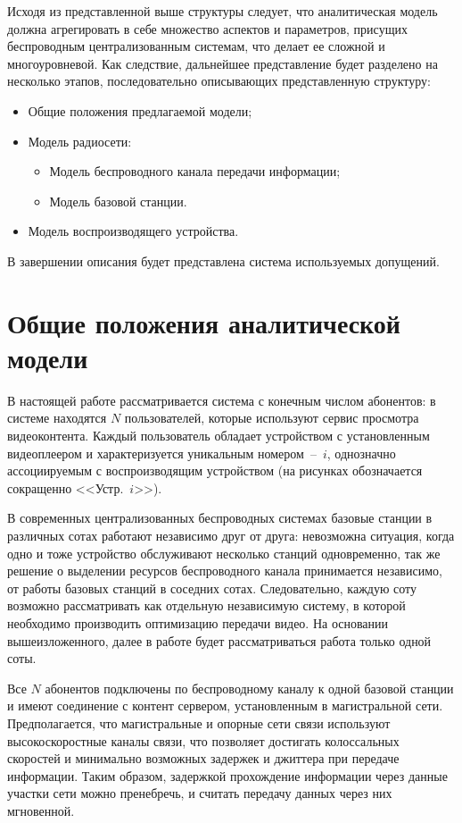Исходя из представленной выше структуры следует, что аналитическая модель должна агрегировать в себе множество аспектов и параметров, присущих беспроводным централизованным системам, что делает ее сложной и многоуровневой. Как следствие, дальнейшее представление будет разделено на несколько этапов, последовательно описывающих представленную структуру:
\begin{itemize}
  \item Общие положения предлагаемой модели;
  \item Модель радиосети:
  \begin{itemize}
  	\item Модель беспроводного канала передачи информации;
  	\item Модель базовой станции.
  \end{itemize}
  \item Модель воспроизводящего устройства.
\end{itemize}
В завершении описания будет представлена система используемых допущений.

\section{Общие положения аналитической модели}
\label{chap2:GeneralOverview}

В настоящей работе рассматривается система с конечным числом абонентов: в системе находятся $N$ пользователей, которые используют сервис просмотра видеоконтента. Каждый пользователь обладает устройством с установленным видеоплеером и характеризуется уникальным номером~--~$i$, однозначно ассоциируемым с воспроизводящим устройством (на рисунках обозначается сокращенно <<Устр.~$i$>>).

В современных централизованных беспроводных системах базовые станции в различных сотах работают независимо друг от друга: невозможна ситуация, когда одно и тоже устройство обслуживают несколько станций одновременно, так же решение о выделении ресурсов беспроводного канала принимается независимо, от работы базовых станций в соседних сотах. Следовательно, каждую соту возможно рассматривать как отдельную независимую систему, в которой необходимо производить оптимизацию передачи видео. На основании вышеизложенного, далее в работе будет рассматриваться работа только одной соты.

Все $N$ абонентов подключены по беспроводному каналу к одной базовой станции и имеют соединение с контент сервером, установленным в магистральной сети. Предполагается, что магистральные и опорные сети связи используют высокоскоростные каналы связи, что позволяет достигать колоссальных скоростей и минимально возможных задержек и джиттера при передаче информации. Таким образом, задержкой прохождение информации через данные участки сети можно пренебречь, и считать передачу данных через них мгновенной.

